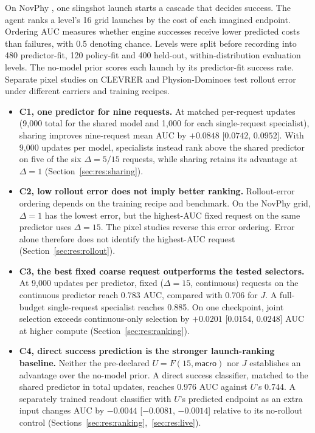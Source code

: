 \begin{revblock}
On NovPhy \citep{pinto2024novphy}, one slingshot launch starts a cascade that decides success. The agent ranks a level's 16 grid launches by the cost of each imagined endpoint. Ordering AUC measures whether engine successes receive lower predicted costs than failures, with 0.5 denoting chance. Levels were split before recording into 480 predictor-fit, 120 policy-fit and 400 held-out, within-distribution evaluation levels. The no-model prior scores each launch by its predictor-fit success rate. Separate pixel studies on CLEVRER \citep{yi2020clevrer} and Physion-Dominoes \citep{bear2021physion} test rollout error under different carriers and training recipes.
\begin{itemize}
  \item \textbf{C1, one predictor for nine requests.} At matched per-request updates (9,000 total for the shared model and 1,000 for each single-request specialist), sharing improves nine-request mean AUC by $+0.0848$ [$0.0742$, $0.0952$]. With 9,000 updates per model, specialists instead rank above the shared predictor on five of the six $\Delta=5/15$ requests, while sharing retains its advantage at $\Delta=1$ (Section~\ref{sec:res:sharing}).
  \item \textbf{C2, low rollout error does not imply better ranking.} Rollout-error ordering depends on the training recipe and benchmark. On the NovPhy grid, $\Delta=1$ has the lowest error, but the highest-AUC fixed request on the same predictor uses $\Delta=15$. The pixel studies reverse this error ordering. Error alone therefore does not identify the highest-AUC request (Section~\ref{sec:res:rollout}).
  \item \textbf{C3, the best fixed coarse request outperforms the tested selectors.} At 9,000 updates per predictor, fixed ($\Delta=15$, continuous) requests on the continuous predictor reach 0.783 AUC, compared with 0.706 for $J$. A full-budget single-request specialist reaches 0.885. On one checkpoint, joint selection exceeds continuous-only selection by $+0.0201$ [$0.0154$, $0.0248$] AUC at higher compute (Section~\ref{sec:res:ranking}).
  \item \textbf{C4, direct success prediction is the stronger launch-ranking baseline.} Neither the pre-declared $U=F(15,\textsf{macro})$ nor $J$ establishes an advantage over the no-model prior. A direct success classifier, matched to the shared predictor in total updates, reaches 0.976 AUC against $U$'s 0.744. A separately trained readout classifier with $U$'s predicted endpoint as an extra input changes AUC by $-0.0044$ [$-0.0081$, $-0.0014$] relative to its no-rollout control (Sections~\ref{sec:res:ranking},~\ref{sec:res:live}).
\end{itemize}
\end{revblock}
